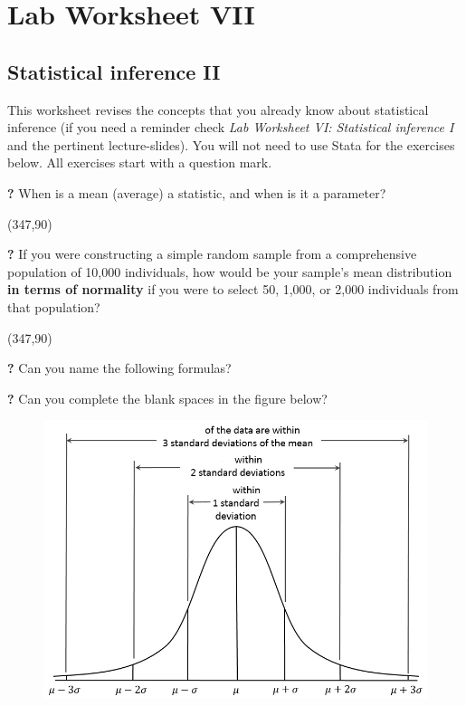 \documentclass{article}
\newcommand{\forceindent}{\leavevmode{\parindent=2em\indent}}
\begin{document}
\section*{\hfil Lab Worksheet VII \hfil}
\subsection*{Statistical inference II}

This worksheet revises the concepts that you already know about statistical inference (if you need a reminder check \textit{Lab Worksheet VI: Statistical inference I} and the pertinent lecture-slides). You will not need to use Stata for the exercises below. All exercises start with a question mark. 

\forceindent \textbf{?} When is a mean (average) a statistic, and when is it a parameter?

\framebox(347,90){}

\forceindent \textbf{?} If you were constructing a simple random sample from a comprehensive population of 10,000 individuals, how would be your sample's mean distribution \textbf{in terms of normality} if you were to select 50, 1,000, or 2,000 individuals from that population?

\framebox(347,90){}

\forceindent \textbf{?} Can you name the following formulas?

\begin{center}
\end{center}

\begin{center}
\end{center}

\begin{center}
\end{center}

\forceindent \textbf{?} Can you complete the blank spaces in the figure below?

\begin{figure}[H]
	\includegraphics[width=\linewidth]{Gaussian_distribution.jpg}
\end{figure}
\end{document}
